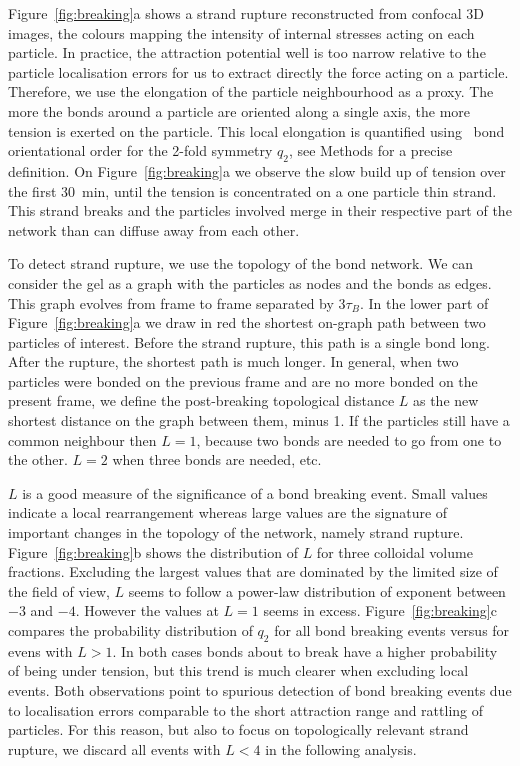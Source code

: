 Figure~\ref{fig:breaking}a shows a strand rupture reconstructed from confocal 3D images, the colours mapping the intensity of internal stresses acting on each particle. In practice, the attraction potential well is too narrow relative to the particle localisation errors for us to extract directly the force acting on a particle. Therefore, we use the elongation of the particle neighbourhood as a proxy. The more the bonds around a particle are oriented along a single axis, the more tension is exerted on the particle. This local elongation is quantified using~\cite{steinhardt1983boo} bond orientational order for the 2-fold symmetry $q_2$, see Methods for a precise definition. On Figure~\ref{fig:breaking}a we observe the slow build up of tension over the first \SI{30}{\minute}, until the tension is concentrated on a one particle thin strand. This strand breaks and the particles involved merge in their respective part of the network than can diffuse away from each other.

To detect strand rupture, we use the topology of the bond network. We can consider the gel as a graph with the particles as nodes and the bonds as edges. This graph evolves from frame to frame separated by $3\tau_B$. In the lower part of Figure~\ref{fig:breaking}a we draw in red the shortest on-graph path between two particles of interest. Before the strand rupture, this path is a single bond long. After the rupture, the shortest path is much longer. In general, when two particles were bonded on the previous frame and are no more bonded on the present frame, we define the post-breaking topological distance $L$ as the new shortest distance on the graph between them, minus 1. If the particles still have a common neighbour then $L=1$, because two bonds are needed to go from one to the other. $L=2$ when three bonds are needed, etc.

$L$ is a good measure of the significance of a bond breaking event. Small values indicate a local rearrangement whereas large values are the signature of important changes in the topology of the network, namely strand rupture. Figure~\ref{fig:breaking}b shows the distribution of $L$ for three colloidal volume fractions. Excluding the largest values that are dominated by the limited size of the field of view, $L$ seems to follow a power-law distribution of exponent between $-3$ and $-4$. However the values at $L=1$ seems in excess. Figure~\ref{fig:breaking}c compares the probability distribution of $q_2$ for all bond breaking events versus for evens with $L>1$. In both cases bonds about to break have a higher probability of being under tension, but this trend is much clearer when excluding local events. Both observations point to spurious detection of bond breaking events due to localisation errors comparable to the short attraction range and rattling of particles. For this reason, but also to focus on topologically relevant strand rupture, we discard all events with $L<4$ in the following analysis.




